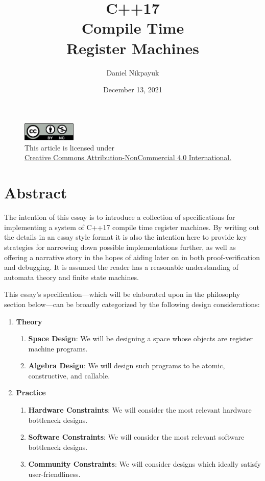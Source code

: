 \documentclass[twoside]{article}
\title{C++17\\Compile Time\\Register Machines}
\author{Daniel Nikpayuk}
\date{December 13, 2021}
\newcommand{\strong}[1]{{\bfseries #1}}
\begin{document}
\maketitle
\thispagestyle{empty}

\begin{figure}[h]
\centering
\includegraphics[width=1in]{../../../cc-by-nc.png}\\[0.1in]
\tiny This article is licensed under \\
\href{http://creativecommons.org/licenses/by-nc/4.0/}
{Creative Commons Attribution-NonCommercial 4.0 International.}\\[0.3in]
\end{figure}

\section*{Abstract}

The intention of this essay is to introduce a collection of specifications for implementing a system of C++17 compile
time register machines. By writing out the details in an essay style format it is also the intention here to provide
key strategies for narrowing down possible implementations further, as well as offering a narrative story in the hopes
of aiding later on in both proof-verification and debugging. It is assumed the reader has a reasonable understanding
of automata theory and finite state machines.

This essay's specification---which will be elaborated upon in the philosophy section below---can be broadly categorized
by the following design considerations:

\begin{enumerate}
\item \strong{Theory}
	\begin{enumerate}
	\item \strong{Space Design}: We will be designing a space whose objects are register machine programs.
	\item \strong{Algebra Design}: We will design such programs to be atomic, constructive, and callable.
	\end{enumerate}
\item \strong{Practice}
	\begin{enumerate}
	\item \strong{Hardware Constraints}: We will consider the most relevant hardware bottleneck designs.
	\item \strong{Software Constraints}: We will consider the most relevant software bottleneck designs.
	\item \strong{Community Constraints}: We will consider designs which ideally satisfy user-friendliness.
	\end{enumerate}
\end{enumerate}
\end{document}
